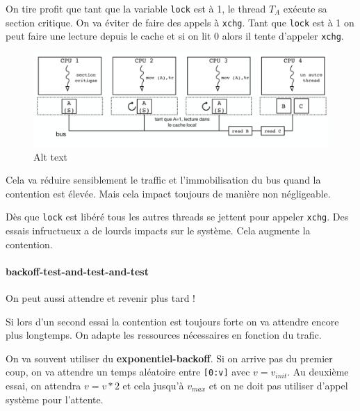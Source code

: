 On tire profit que tant que la variable \texttt{lock} est à 1, le thread
\(T_A\) exécute sa section critique. On va éviter de faire des appels à
\texttt{xchg}. Tant que \texttt{lock} est à 1 on peut faire une lecture
depuis le cache et si on lit 0 alors il tente d'appeler \texttt{xchg}.

\begin{Shaded}
\begin{Highlighting}[]
 \OperatorTok{(}\OperatorTok{(}\OperatorTok{,} \OperatorTok{))} \OperatorTok{\{} 
\OperatorTok{\}}
\end{Highlighting}
\end{Shaded}

\begin{figure}
\centering
\includegraphics{image-30-1.png}
\caption{Alt text}
\end{figure}

Cela va réduire sensiblement le traffic et l'immobilisation du bus quand
la contention est élevée. Mais cela impact toujours de manière non
négligeable.

Dès que \texttt{lock} est libéré tous les autres threads se jettent pour
appeler \texttt{xchg}. Des essais infructueux a de lourds impacts sur le
système. Cela augmente la contention.

\paragraph{backoff-test-and-test-and-test}\label{backoff-test-and-test-and-test}

On peut aussi attendre et revenir plus tard !

Si lors d'un second essai la contention est toujours forte on va
attendre encore plus longtemps. On adapte les ressources nécessaires en
fonction du trafic.

On va souvent utiliser du \textbf{exponentiel-backoff}. Si on arrive pas
du premier coup, on va attendre un temps aléatoire entre
\texttt{{[}0:v{]}} avec \(v=v_{init}\). Au deuxième essai, on attendra
\(v=v*2\) et cela jusqu'à \(v_{max}\) et on ne doit pas utiliser d'appel
système pour l'attente.


